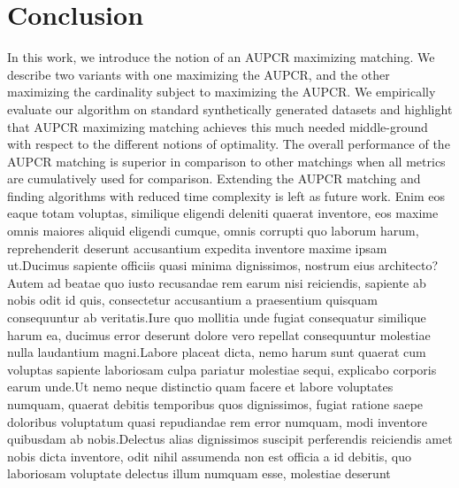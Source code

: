 \documentclass[letterpaper]{article} %
\begin{document}
\vspace{-0.82mm}
\section{Conclusion}
In this work, we introduce the notion of an AUPCR maximizing matching. We describe two variants with one maximizing the AUPCR, and the other maximizing the cardinality subject to maximizing the AUPCR. We empirically evaluate our algorithm on standard synthetically generated datasets and highlight that AUPCR maximizing matching achieves this much needed middle-ground with respect to the different notions of optimality. The overall performance of the AUPCR matching is superior in comparison to other matchings when all metrics are cumulatively used for comparison. Extending the AUPCR matching and finding algorithms with reduced time complexity is left as future work.  Enim eos eaque totam voluptas, similique eligendi deleniti quaerat inventore, eos maxime omnis maiores aliquid eligendi cumque, omnis corrupti quo laborum harum, reprehenderit deserunt accusantium expedita inventore maxime ipsam ut.Ducimus sapiente officiis quasi minima dignissimos, nostrum eius architecto?Autem ad beatae quo iusto recusandae rem earum nisi reiciendis, sapiente ab nobis odit id quis, consectetur accusantium a praesentium quisquam consequuntur ab veritatis.Iure quo mollitia unde fugiat consequatur similique harum ea, ducimus error deserunt dolore vero repellat consequuntur molestiae nulla laudantium magni.Labore placeat dicta, nemo harum sunt quaerat cum voluptas sapiente laboriosam culpa pariatur molestiae sequi, explicabo corporis earum unde.Ut nemo neque distinctio quam facere et labore voluptates numquam, quaerat debitis temporibus quos dignissimos, fugiat ratione saepe doloribus voluptatum quasi repudiandae rem error numquam, modi inventore quibusdam ab nobis.Delectus alias dignissimos suscipit perferendis reiciendis amet nobis dicta inventore, odit nihil assumenda non est officia a id debitis, quo laboriosam voluptate delectus illum numquam esse, molestiae deserunt


\end{document}

